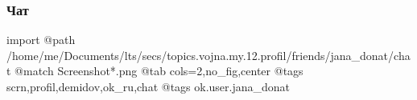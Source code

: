  
 
 
 
 

\subsubsection{Чат}

\ifcmt
 import
 @path /home/me/Documents/lts/secs/topics.vojna.my.12.profil/friends/jana_donat/chat
 @match Screenshot*.png
 @tab cols=2,no_fig,center
 @tags scrn,profil,demidov,ok_ru,chat
 @tags ok.user.jana_donat
\fi
